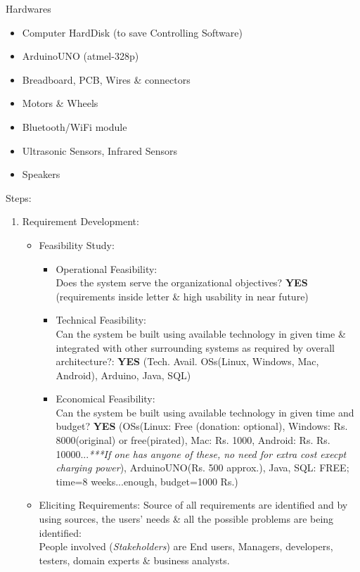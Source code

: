 \documentclass{article}
\begin{document}
\begin{enumerate}
\begin{itemize}
			\end{itemize}
			Hardwares
			\begin{itemize}
				\item Computer HardDisk (to save Controlling Software) \item ArduinoUNO (atmel-328p) \item Breadboard, PCB, Wires \& connectors \item Motors \& Wheels \item Bluetooth/WiFi module \item Ultrasonic Sensors, Infrared Sensors \item Speakers
			\end{itemize}
		\end{enumerate}
		Steps:
		\begin{enumerate}
			\item Requirement Development:		
			\begin{itemize}
				\item Feasibility Study:
				\begin{itemize}
					\item Operational Feasibility:
\\Does the system serve the organizational objectives?	\textbf{YES} (requirements inside letter \& high usability in near future)
					\item Technical Feasibility:
\\Can the system be built using available technology in given time \& integrated with other surrounding systems as required by overall architecture?: \textbf{YES} (Tech. Avail. OSs(Linux, Windows, Mac, Android), Arduino, Java, SQL)
					\item Economical Feasibility:
\\Can the system be built using available technology in given time and budget? \textbf{YES} (OSs(Linux: Free (donation: optional), Windows: Rs. 8000(original) or free(pirated), Mac: Rs. 1000, Android: Rs. Rs. 10000...\emph{***If one has anyone of these, no need for extra cost execpt charging power}), ArduinoUNO(Rs. 500 approx.), Java, SQL: FREE; time=8 weeks...enough, budget=1000 Rs.)
				\end{itemize}
				\item Eliciting Requirements:
				Source of all requirements are identified and by using sources, the users' needs \& all the possible problems are being identified:
\\People involved (\emph{Stakeholders}) are End users, Managers, developers, testers, domain experts \& business analysts.

\end{itemize}
\end{enumerate}
\end{document}
